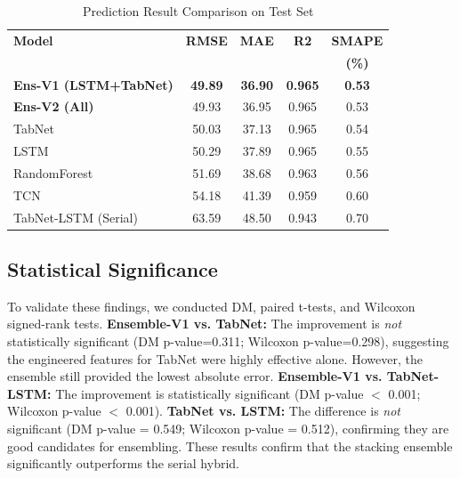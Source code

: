 \documentclass[conference]{IEEEtran}
\begin{document}
\begin{table}[!t]
  \centering
  \small
  \caption{Prediction Result Comparison on Test Set}
  \label{tab:results}
  \begin{tabular}{@{}l S[table-format=2.2] S[table-format=2.2] S[table-format=0.3] S[table-format=0.2]@{}}
    \toprule
    \textbf{Model}                & {\textbf{RMSE}} & {\textbf{MAE}} & {\textbf{R2}}  & {\textbf{SMAPE}} \\
                                  &                 &                &                & {\textbf{(\%)}}  \\
    \midrule
    \textbf{Ens-V1 (LSTM+TabNet)} & \textbf{49.89}  & \textbf{36.90} & \textbf{0.965} & \textbf{0.53}    \\
    \textbf{Ens-V2 (All)}         & 49.93           & 36.95          & 0.965          & 0.53             \\
    TabNet                        & 50.03           & 37.13          & 0.965          & 0.54             \\
    LSTM                          & 50.29           & 37.89          & 0.965          & 0.55             \\
    RandomForest                  & 51.69           & 38.68          & 0.963          & 0.56             \\
    TCN                           & 54.18           & 41.39          & 0.959          & 0.60             \\
    TabNet-LSTM (Serial)          & 63.59           & 48.50          & 0.943          & 0.70             \\
    \bottomrule
  \end{tabular}
\end{table}


\subsection{Statistical Significance}
\par To validate these findings, we conducted DM, paired t-tests, and Wilcoxon signed-rank tests. \textbf{Ensemble-V1 vs. TabNet:} The improvement is \textit{not} statistically significant (DM p-value=0.311; Wilcoxon p-value=0.298), suggesting the engineered features for TabNet were highly effective alone. However, the ensemble still provided the lowest absolute error. \textbf{Ensemble-V1 vs. TabNet-LSTM:} The improvement is statistically significant (DM p-value $<$ 0.001; Wilcoxon p-value $<$ 0.001). \textbf{TabNet vs. LSTM:} The difference is \textit{not} significant (DM p-value = 0.549; Wilcoxon p-value = 0.512), confirming they are good candidates for ensembling. These results confirm that the stacking ensemble significantly outperforms the serial hybrid.
\end{document}
